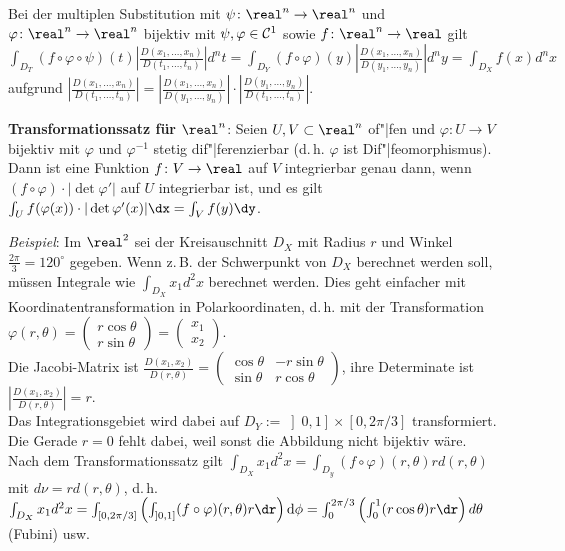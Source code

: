 Bei der multiplen Substitution mit $\psi\colon \real^n \rightarrow \real^n$
und $\varphi\colon \real^n \rightarrow \real^n$ bijektiv mit
$\psi, \varphi \in \mathcal{C}^1$ sowie $f\colon \real^n \rightarrow \real$ gilt
$\int_{D_T} (f \circ \varphi \circ \psi)(t)
\left|\frac{D(x_1, \dotsc, x_n)}{D(t_1, \dotsc, t_n)}\right| d^n t =
\int_{D_Y} (f \circ \varphi)(y)
\left|\frac{D(x_1, \dotsc, x_n)}{D(y_1, \dotsc, y_n)}\right| d^n y =
\int_{D_X} f(x) d^n x$ aufgrund
$\left|\frac{D(x_1, \dotsc, x_n)}{D(t_1, \dotsc, t_n)}\right| =
\left|\frac{D(x_1, \dotsc, x_n)}{D(y_1, \dotsc, y_n)}\right| \cdot
\left|\frac{D(y_1, \dotsc, y_n)}{D(t_1, \dotsc, t_n)}\right|$.

\linie

\textbf{Transformationssatz für $\real^n$}:
Seien $U, V \subset \real^n$ of"|fen und $\varphi\colon U \rightarrow V$
bijektiv mit $\varphi$ und $\varphi^{-1}$ stetig dif"|ferenzierbar
(d.\,h. $\varphi$ ist Dif"|feomorphismus). \\
Dann ist eine Funktion $f\colon V \rightarrow \real$ auf
$V$ integrierbar genau dann, wenn $(f \circ \varphi) \cdot |\det \varphi'|$
auf $U$ integrierbar ist, und es gilt
$\int_U f(\varphi(x)) \cdot |\det \varphi'(x)| \dx = \int_V f(y) \dy$.

\linie

\emph{Beispiel}:
Im $\real^2$ sei der Kreisauschnitt $D_X$ mit Radius $r$ und Winkel
$\frac{2\pi}{3} = 120^\circ$ gegeben.
Wenn z.\,B. der Schwerpunkt von $D_X$ berechnet werden soll, müssen Integrale
wie $\int_{D_X} x_1 d^2 x$ berechnet werden.
Dies geht einfacher mit Koordinatentransformation in Polarkoordinaten,
d.\,h. mit der Transformation $\varphi(r, \theta) =
\begin{pmatrix}r \cos \theta \\ r \sin \theta\end{pmatrix} =
\begin{pmatrix}x_1 \\ x_2\end{pmatrix}$. \\
Die Jacobi-Matrix ist $\frac{D(x_1, x_2)}{D(r, \theta)} =
\begin{pmatrix}\cos \theta & -r \sin \theta \\
\sin \theta & r \cos \theta\end{pmatrix}$, ihre Determinate ist
$\left|\frac{D(x_1, x_2)}{D(r, \theta)}\right| = r$. \\
Das Integrationsgebiet wird dabei auf
$D_Y := \left]0, 1\right] \times [0, 2\pi/3]$ transformiert.
Die Gerade $r = 0$ fehlt dabei, weil sonst die Abbildung nicht
bijektiv wäre. \\
Nach dem Transformationssatz gilt $\int_{D_X} x_1 d^2 x =
\int_{D_y} (f \circ \varphi)(r, \theta) r d(r, \theta)$ mit
$d\nu = r d(r, \theta)$, d.\,h.
$\int_{D_X} x_1 d^2 x = \int_{[0, 2\pi/3]}
\left(\int_{\left]0, 1\right]} (f \circ \varphi)(r, \theta) r\dr\right) \d\phi =
\int_0^{2\pi/3} \left(\int_0^1 (r \cos \theta) r\dr\right) d\theta$
(Fubini) usw.

